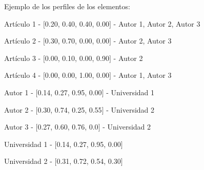 Ejemplo de los perfiles de los elementos:

\begin{description}
 \item[Artículo - Topic Profile - Autores]
 \item Artículo 1 - $[$0.20, 0.40, 0.40, 0.00$]$ - Autor 1, Autor 2, Autor 3
 \item Artículo 2 - $[$0.30, 0.70, 0.00, 0.00$]$ - Autor 2, Autor 3
 \item Artículo 3 - $[$0.00, 0.10, 0.00, 0.90$]$ - Autor 2
 \item Artículo 4 - $[$0.00, 0.00, 1.00, 0.00$]$ - Autor 1, Autor 3
\end{description}

\begin{description}
 \item[Autor - Topic Profile - Universidad]
 \item Autor 1 - $[$0.14, 0.27, 0.95, 0.00$]$ - Universidad 1
 \item Autor 2 - $[$0.30, 0.74, 0.25, 0.55$]$ - Universidad 2
 \item Autor 3 - $[$0.27, 0.60, 0.76, 0.0$]$ - Universidad 2
\end{description}

\begin{description}
 \item[Universidad - Topic Profile]
 \item Universidad 1 - $[$0.14, 0.27, 0.95, 0.00$]$
 \item Universidad 2 - $[$0.31, 0.72, 0.54, 0.30$]$
\end{description}

